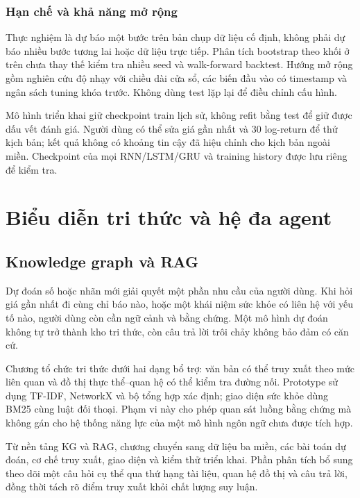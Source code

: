 \section{Hạn chế và khả năng mở rộng}\label{hux1ea1n-chux1ebf-vuxe0-khux1ea3-nux103ng-mux1edf-rux1ed9ng}

Thực nghiệm là dự báo một bước trên bản chụp dữ liệu cố định, không phải dự báo
nhiều bước tương lai hoặc dữ liệu trực tiếp. Phân tích bootstrap theo
khối ở trên chưa thay thế kiểm tra nhiều seed và walk-forward backtest.
Hướng mở rộng gồm nghiên cứu độ nhạy với chiều dài cửa sổ, các biến đầu
vào có timestamp và ngân sách tuning khóa trước. Không dùng test lặp lại
để điều chỉnh cấu hình.

Mô hình triển khai giữ checkpoint train lịch sử, không refit bằng test
để giữ được dấu vết đánh giá. Người dùng có thể sửa giá gần nhất và 30
log-return để thử kịch bản; kết quả không có khoảng tin cậy đã hiệu
chỉnh cho kịch bản ngoài miền. Checkpoint của mọi RNN/LSTM/GRU và
training history được lưu riêng để kiểm tra.

\part{Biểu diễn tri thức và hệ đa agent}
\chapter{Knowledge graph và RAG}\label{chux1b0ux1a1ng-5.-knowledge-graph-vuxe0-RAG}

Dự đoán số hoặc nhãn mới giải quyết một phần nhu cầu của người dùng. Khi
hỏi giá gần nhất đi cùng chỉ báo nào, hoặc một khái niệm sức khỏe có
liên hệ với yếu tố nào, người dùng còn cần ngữ cảnh và bằng chứng. Một
mô hình dự đoán không tự trở thành kho tri thức, còn câu trả lời trôi
chảy không bảo đảm có căn cứ.

Chương tổ chức tri thức dưới hai dạng bổ trợ: văn bản có thể truy xuất
theo mức liên quan và đồ thị thực thể--quan hệ có thể kiểm tra đường
nối. Prototype sử dụng TF-IDF, NetworkX và bộ tổng hợp xác định; giao
diện sức khỏe dùng BM25 cùng luật đối thoại. Phạm vi này cho phép quan
sát luồng bằng chứng mà không gán cho hệ thống năng lực của một mô hình
ngôn ngữ chưa được tích hợp.

Từ nền tảng KG và RAG, chương chuyển sang dữ liệu ba miền, các bài toán
dự đoán, cơ chế truy xuất, giao diện và kiểm thử triển khai. Phần phân
tích bổ sung theo dõi một câu hỏi cụ thể qua thứ hạng tài liệu, quan hệ
đồ thị và câu trả lời, đồng thời tách rõ điểm truy xuất khỏi chất lượng
suy luận.

